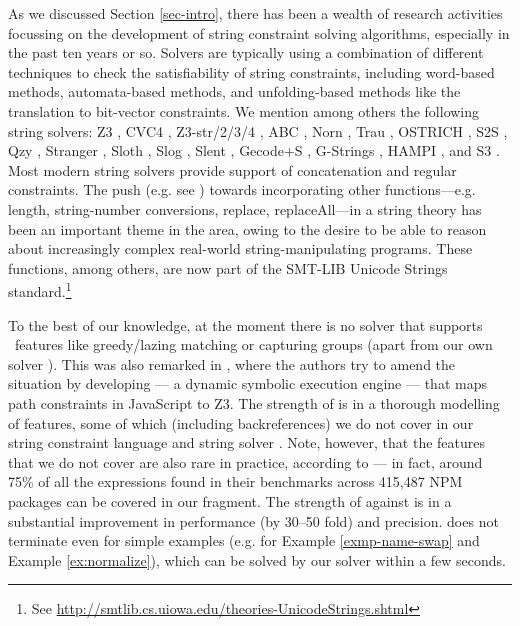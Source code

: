 \smallskip
{}
As we discussed Section \ref{sec-intro}, there has been a wealth of research
activities focussing on the development of string constraint solving algorithms, especially
in the past ten years or so. Solvers are typically using a combination
of different techniques to check the satisfiability of string constraints,
including word-based methods, automata-based methods, and unfolding-based methods
like the translation to bit-vector constraints.
We mention among others the following string solvers:
Z3 \cite{Z3}, CVC4 \cite{cvc4}, Z3-str/2/3/4 \cite{Z3-str,Z3-str2,Z3-str3,BerzishMurphy2021},
 ABC \cite{ABC}, Norn
\cite{Abdulla14}, Trau \cite{Z3-trau,AbdullaACDHRR18-trau,Abdulla17}, OSTRICH
\cite{CHL+19}, S2S \cite{DBLP:conf/aplas/LeH18}, Qzy \cite{cox2017model}, Stranger \cite{Stranger}, Sloth
\cite{HJLRV18,AbdullaA+19},
Slog \cite{fang-yu-circuits}, Slent \cite{WC+18}, Gecode+S \cite{DBLP:conf/cpaior/ScottFPS17}, G-Strings \cite{DBLP:conf/cp/AmadiniGST17}, HAMPI
\cite{HAMPI}, and S3 \cite{S3}. 
Most modern string solvers provide support of concatenation and regular 
constraints. The push (e.g. see
\cite{GB16,Vijay-length,HAMPI,Berkeley-JavaScript,LB16,S3})
towards incorporating other functions---e.g. length, 
string-number conversions, replace, replaceAll---in a string theory has been an
important theme in the area, owing to the desire to be able to reason 
about increasingly complex real-world string-manipulating programs.
These functions, among others, are now part of the SMT-LIB Unicode Strings
standard.\footnote{See
\url{http://smtlib.cs.uiowa.edu/theories-UnicodeStrings.shtml}}

To the best of our knowledge, at the moment there is no solver that
supports \regexp\ features like greedy/lazing matching or capturing
groups (apart from our own solver \ostrich). This was also remarked in
\cite{LMK19}, where the authors try to amend the situation by developing 
\expose{} --- a dynamic symbolic execution engine --- that maps path 
constraints in JavaScript to Z3. The strength of \expose{} is in a thorough
modelling of \regexp{} features, some of which (including backreferences) we do 
not cover in our string constraint language and string solver \ostrich{}. Note, however,
that the features that we do not cover are also rare in practice, according to
\cite{LMK19} --- in fact, around 75\% of all the \regexp{} expressions found in
their benchmarks across 415,487 NPM packages can be covered in our fragment.
The strength of \ostrich{} against \expose{} is in a substantial improvement in
performance (by 30--50 fold) and precision. \expose{} does not terminate 
even for simple examples (e.g. for Example \ref{exmp-name-swap} and Example 
\ref{ex:normalize}), which can be solved by our solver within a few seconds.

